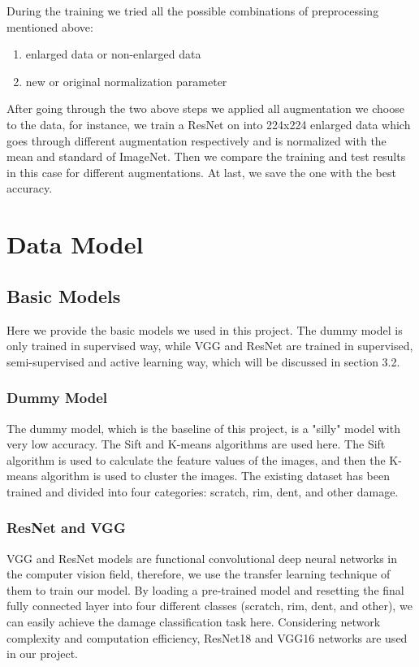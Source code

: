 \documentclass[lang=english,inputenc=utf8,fontsize=10pt]{ldvarticle}
\begin{document}
During the training we tried all the possible combinations of preprocessing mentioned above: 
\begin{enumerate}
    \item enlarged data or non-enlarged data
    \item new or original normalization parameter
\end{enumerate}

After going through the two above steps we applied all augmentation we choose to the data, for instance, we train a ResNet on into 224x224 enlarged data which goes through different augmentation respectively and is normalized with the mean and standard of ImageNet. Then we compare the training and test results in this case for different augmentations. At last, we save the one with the best accuracy.


\newpage

\section{Data Model}
\subsection{Basic Models}
Here we provide the basic models we used in this project. The dummy model is only trained in supervised way, while VGG and ResNet are trained in supervised, semi-supervised and active learning way, which will be discussed in section 3.2.
\subsubsection{Dummy Model}
The dummy model, which is the baseline of this project, is a "silly" model with very low accuracy. The Sift and K-means algorithms are used here. The Sift algorithm is used to calculate the feature values of the images, and then the K-means algorithm is used to cluster the images. The existing dataset has been trained and divided into four categories: scratch, rim, dent, and other damage.

\subsubsection{ResNet and VGG}
VGG and ResNet models are functional convolutional deep neural networks in the computer vision field, therefore, we use the transfer learning technique of them to train our model. By loading a pre-trained model and resetting the final fully connected layer into four different classes (scratch, rim, dent, and other), we can easily achieve the damage classification task here. Considering network complexity and computation efficiency, ResNet18 and VGG16 networks are used in our project. 
\end{document}
